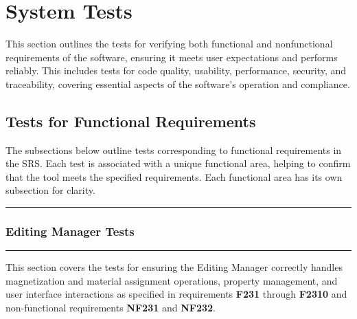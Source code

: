 \documentclass[12pt, titlepage]{article}
\begin{document}


\section{System Tests}

This section outlines the tests for verifying both functional and
nonfunctional requirements of the software, ensuring it meets user
expectations and performs reliably. This includes tests for code
quality, usability, performance, security, and traceability, covering
essential aspects of the software's operation and compliance.

\subsection{Tests for Functional Requirements}

The subsections below outline tests corresponding to functional
requirements in the SRS. Each test is associated with a
unique functional area, helping to confirm that the tool meets the
specified requirements. Each functional area has its own subsection for clarity.

\noindent
\rule{\textwidth}{0.5pt}

\subsubsection{Editing Manager Tests}
\rule{\textwidth}{0.5pt}

\medskip

\noindent
This section covers the tests for ensuring the Editing Manager correctly
handles magnetization and material assignment operations, property management,
and user interface interactions as specified in requirements \textbf{F231} through \textbf{F2310}
and non-functional requirements \textbf{NF231} and \textbf{NF232}.
\end{document}
